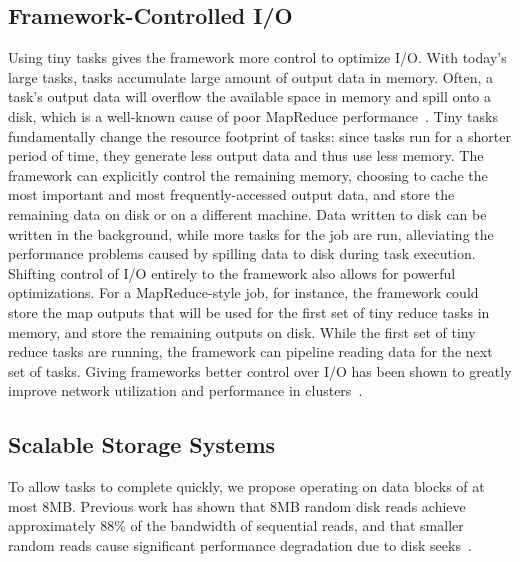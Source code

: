 \subsection{Framework-Controlled I/O}
\label{sec:pipeline}

Using tiny tasks gives the framework more control to optimize I/O.
With
today's large tasks, tasks accumulate large amount of output data in memory.
Often, a task's output data will overflow the available space in memory
and spill onto a disk, which is a well-known cause of poor MapReduce
performance~\cite{lipcon2012optimizing}. Tiny tasks fundamentally change the
resource footprint of tasks: since tasks run for a shorter period of time,
they generate less output data and thus use less memory. The framework can
explicitly control the remaining memory, choosing to cache the most important
and most frequently-accessed output data, and store the remaining data on disk
or on a different machine. Data written to disk can be written in the
background, while more tasks for the job are run, alleviating the performance
problems caused by spilling data to disk during task execution.
Shifting control of I/O entirely to the framework also allows for
powerful optimizations.  For a MapReduce-style job, for instance, the
framework could store the map outputs that will be used for the first set of
tiny reduce tasks in memory, and store the remaining outputs on disk. While
the first set of tiny reduce tasks are running, the framework can pipeline
reading data for the next set of tasks.  Giving frameworks better control over
I/O has been shown
to greatly improve network utilization and performance in
clusters~\cite{chowdhury2011managing, chowdhury2012coflow}.

\subsection{Scalable Storage Systems}
To allow tasks to complete quickly, we propose operating on data blocks of
at most $8$MB. Previous work has shown that $8$MB random disk reads achieve
approximately $88$\% of the bandwidth of sequential reads, and that smaller random
reads cause significant performance degradation due to disk
seeks~\cite{nightingale2012flat}. 

